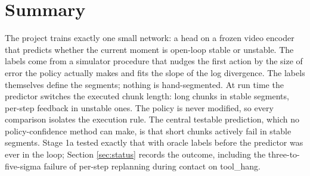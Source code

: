 \documentclass[11pt]{article}
\begin{document}
\section{Summary}

The project trains exactly one small network: a head on a frozen video encoder that
predicts whether the current moment is open-loop stable or unstable. The labels come
from a simulator procedure that nudges the first action by the size of error the policy
actually makes and fits the slope of the log divergence. The labels themselves define
the segments; nothing is hand-segmented. At run time the predictor switches the executed
chunk length: long chunks in stable segments, per-step feedback in unstable ones. The
policy is never modified, so every comparison isolates the execution rule. The central
testable prediction, which no policy-confidence method can make, is that short chunks
actively fail in stable segments. Stage 1a tested exactly that with oracle labels before
the predictor was ever in the loop; Section \ref{sec:status} records the outcome,
including the three-to-five-sigma failure of per-step replanning during contact on
tool\_hang.
\end{document}
